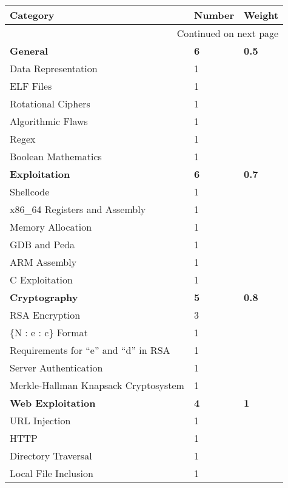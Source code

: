 \documentclass[twoside,a4paper,11pt]{report}
\begin{document}
		\begin{center}
			\begin{longtable}{| l | l | l |}
				\hline
				\textbf{Category} & \textbf{Number} & \textbf{Weight} \\ \hline 
				\endhead
				\multicolumn{3}{|r|}{{Continued on next page}} \\ \hline
				\endfoot
				\endlastfoot
				\textbf{General} & \textbf{6} & \textbf{0.5} \\ \hline
				\quad Data Representation & 1 & \\ \hline
				\quad ELF Files & 1 & \\ \hline
				\quad Rotational Ciphers & 1 & \\ \hline
				\quad Algorithmic Flaws & 1 & \\ \hline 
				\quad Regex & 1 & \\ \hline 
				\quad Boolean Mathematics & 1 & \\ \hline 
				\textbf{Exploitation} & \textbf{6} & \textbf{0.7}\\ \hline
				\quad Shellcode & 1 & \\ \hline
				\quad x86\_64 Registers and Assembly & 1 & \\ \hline
				\quad Memory Allocation & 1 & \\ \hline
				\quad GDB and Peda & 1 & \\ \hline
				\quad ARM Assembly & 1 & \\ \hline
				\quad C Exploitation & 1 & \\ \hline 
				\textbf{Cryptography} & \textbf{5} & \textbf{0.8} \\ \hline
				\quad RSA Encryption & 3 & \\ \hline
				\qquad \{N : e : c\} Format & 1 & \\ \hline
				\qquad Requirements for ``e'' and ``d'' in RSA & 1 & \\ \hline
				\quad Server Authentication & 1 & \\ \hline
				\quad Merkle-Hallman Knapsack Cryptosystem & 1 & \\ \hline
				\textbf{Web Exploitation} & \textbf{4} & \textbf{1} \\ \hline
				\quad URL Injection & 1 & \\ \hline
				\quad HTTP & 1 & \\ \hline 
				\quad Directory Traversal & 1 & \\ \hline
				\quad Local File Inclusion & 1 & \\ \hline 

\end{longtable}
\end{center}
\end{document}
